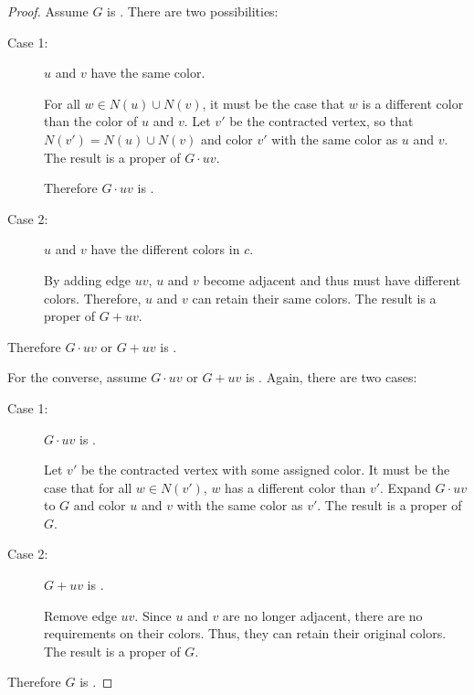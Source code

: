 \begin{proof}
  Assume \(G\) is .  There are two possibilities:
  \begin{description}
  \item [Case 1:] \(u\) and \(v\) have the same color.

    For all \(w\in N(u)\cup N(v)\), it must be the case that \(w\) is a different color than the color of
    \(u\) and \(v\).  Let \(v'\) be the contracted vertex, so that \(N(v')=N(u)\cup N(v)\) and color \(v'\) with
    the same color as \(u\) and \(v\).  The result is a proper  of \(G\cdot uv\).

    Therefore \(G\cdot uv\) is .
      
  \item [Case 2:] \(u\) and \(v\) have the different colors in \(c\).

    By adding edge \(uv\), \(u\) and \(v\) become adjacent and thus must have different colors.  Therefore, \(u\)
    and \(v\) can retain their same colors.  The result is a proper  of \(G+uv\).
  \end{description}

  Therefore \(G\cdot uv\) or \(G+uv\) is .
    
  For the converse, assume \(G\cdot uv\) or \(G+uv\) is .  Again, there are two cases:
  \begin{description}
  \item [Case 1:] \(G\cdot uv\) is .

    Let \(v'\) be the contracted vertex with some assigned color.  It must be the case that for all \(w\in N(v')\),
    \(w\) has a different color than \(v'\).  Expand \(G\cdot uv\) to \(G\) and color \(u\) and \(v\) with
    the same color as \(v'\).  The result is a proper  of \(G\).
    
  \item [Case 2:] \(G+uv\) is .

    Remove edge \(uv\).  Since \(u\) and \(v\) are no longer adjacent, there are no requirements on their colors.
    Thus, they can retain their original colors.  The result is a proper  of \(G\).
  \end{description}

  Therefore \(G\) is .
\end{proof}
